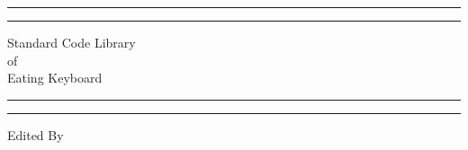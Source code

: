 \documentclass[UTF8]{ctexart}
\begin{document}
\newpage
\begin{titlepage} %

	\centering %
	
	\scshape %
	
	\vspace*{\baselineskip} %
	
	
	\rule{\textwidth}{1.6pt}\vspace*{-\baselineskip}\vspace*{2pt} %
	\rule{\textwidth}{0.4pt} %
	
	\vspace{0.75\baselineskip} %
	
	{\LARGE Standard Code Library\\ of\\ Eating Keyboard\\} %
	
	\vspace{0.75\baselineskip} %
	
	\rule{\textwidth}{0.4pt}\vspace*{-\baselineskip}\vspace{3.2pt} %
	\rule{\textwidth}{1.6pt} %
	
	\vspace{2\baselineskip} %
	
	
	
	\vspace*{3\baselineskip} %
	
	
	Edited By
		
	\vspace{0.5\baselineskip} %
	

\end{titlepage}
\end{document}
